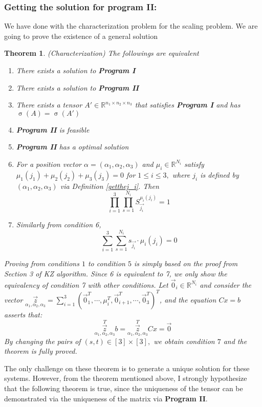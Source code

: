 \documentclass{article}
\newtheorem{theorem}{Theorem}[section]
\begin{document}
\subsubsection{Getting the solution for program II:}
We have done with the characterization problem for the scaling problem. We are going to prove the existence of a general solution
\begin{theorem}{(Characterization)} The followings are equivalent
\begin{enumerate}
    \item There exists a solution to \textbf{Program I}
    \item There exists a solution to \textbf{Program II}
    \item There exists a tensor $A' \in \mathbb{R}^{n_1 \times n_2\times n_3}$ that satisfies \textbf{Program I} and has $\upsigma(A) = \upsigma(A')$
    \item \textbf{Program II} is feasible 
    \item \textbf{Program II} has a optimal solution
    \item For a position vector $\alpha = (\alpha_1, \alpha_2, \alpha_3)$ and $\mu_{i} \in \mathbb{R}^{N_i}$ satisfy $\mu_1(j_1) + \mu_2(j_2) + \mu_3(j_3) = 0$  for $1\leq i \leq 3,$ where $j_i$ is defined by $(\alpha_1, \alpha_2, \alpha_3)$ via Definition \ref{getthej_i}. Then 
    $$\prod_{i=1}^3\prod\limits_{s=1}^{N_i} S_{\Vec{j_i}}^{\mu_i(j_i)} = 1 $$ 
    \item Similarly from condition 6, 
    $$\sum_{i=1}^3\sum\limits_{s=1}^{N_i}s_{\Vec{j_i}} \cdot  \mu_i(j_i) = 0 $$
\end{enumerate}{}
Proving from conditions $1$ to condition $5$ is simply based on the proof from Section 3 of KZ algorithm. Since 6 is equivalent to 7, we only show the equivalency of condition 7 with other conditions. Let $\Vec{0}_i \in \mathbb{R}^{N_i}$ and consider the vector $\Vec{z}\limits_{\alpha_1,\alpha_2,\alpha_3} = \sum_{i=1}^3(\Vec{0}_1^{T}, \cdots, \mu_i^{T}, \Vec{0}_{i+1}^{T}, \cdots, \Vec{0}_{3}^{T})^{T}$, and the equation $Cx=b$ asserts that:
$$\Vec{z}\limits_{\alpha_1,\alpha_2,\alpha_3}^{T}b = \Vec{z}\limits_{\alpha_1,\alpha_2,\alpha_3}^{T}Cx = \Vec{0}$$
By changing the pairs of $(s,t) \in [3] \times [3],$ we obtain condition $7$ and the theorem is fully proved. 
\end{theorem}{}

The only challenge on these theorem is to generate a unique solution for these systems. However, from the theorem mentioned above, I strongly hypothesize that the following theorem is true, since the uniqueness of the tensor can be demonstrated via the uniqueness of the matrix via \textbf{Program II}.
\end{document}
